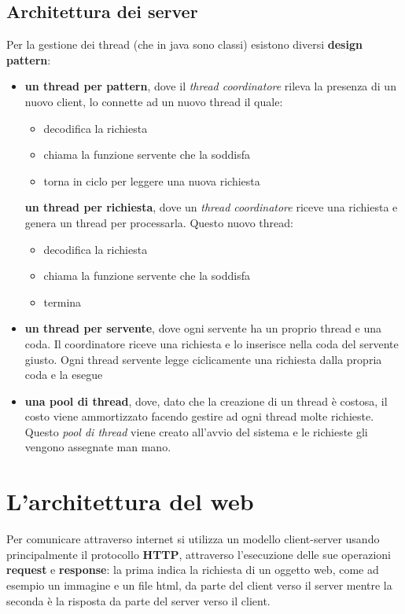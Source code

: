 \message{ !name(sd.tex)}\documentclass[a4paper,12pt, oneside]{book}
\begin{document}
\subsection{Architettura dei server}
Per la gestione dei thread (che in java sono classi) esistono diversi \textbf{design pattern}:
\begin{itemize}
	\item \textbf{un thread per pattern}, dove il \textit{thread coordinatore} rileva la presenza di un nuovo client, lo connette ad un nuovo thread il quale:
	      \begin{itemize}
		      \item decodifica la richiesta
		      \item chiama la funzione servente che la soddisfa
		      \item torna in ciclo per leggere una nuova richiesta
	      \end{itemize}
	      \textbf{un thread per richiesta}, dove un \textit{thread coordinatore} riceve una richiesta e genera un thread per processarla. Questo nuovo thread:
	      \begin{itemize}
		      \item decodifica la richiesta
		      \item chiama la funzione servente che la soddisfa
		      \item termina
	      \end{itemize}
	\item \textbf{un thread per servente}, dove ogni servente ha un proprio thread e una coda. Il coordinatore riceve una richiesta e lo inserisce nella coda del servente giusto. Ogni thread servente legge ciclicamente una richiesta dalla
	      propria coda e la esegue
	\item \textbf{una pool di thread}, dove, dato che la creazione di un thread è costosa, il costo viene ammortizzato facendo gestire ad ogni thread molte richieste. Questo \textit{pool di thread} viene creato all'avvio del sistema e le richieste gli vengono assegnate man mano.
\end{itemize}

\section{L'architettura del web}
Per comunicare attraverso internet si utilizza un modello client-server usando principalmente 
il protocollo \textbf{HTTP}, attraverso l'esecuzione delle sue operazioni \textbf{request} e \textbf{response}:
la prima indica la richiesta di un oggetto web, come ad esempio un immagine e un file html, 
da parte del client verso il server mentre la seconda è la risposta da parte del server verso il client.
\end{document}
